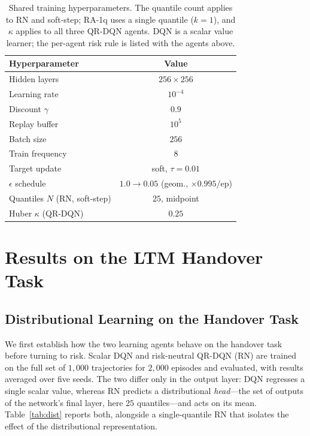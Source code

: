\documentclass[conference]{IEEEtran}
\begin{document}
\begin{table}[htbp]
\caption{Shared training hyperparameters. The quantile count applies to RN and
soft-step; RA-1q uses a single quantile ($k{=}1$), and $\kappa$ applies to all
three QR-DQN agents. DQN is a scalar value learner; the per-agent risk rule is
listed with the agents above.}
\label{tab:hparams}
\centering
\begin{tabular}{|l|c|}
\hline
\textbf{Hyperparameter} & \textbf{Value} \\
\hline
Hidden layers       & $256\times256$ \\
Learning rate       & $10^{-4}$ \\
Discount $\gamma$   & $0.9$ \\
Replay buffer       & $10^{5}$ \\
Batch size          & $256$ \\
Train frequency     & $8$ \\
Target update       & soft, $\tau{=}0.01$ \\
$\epsilon$ schedule & $1.0 \to 0.05$ (geom., $\times0.995/$ep) \\
\hline
Quantiles $N$ (RN, soft-step) & $25$, midpoint \\
Huber $\kappa$ (QR-DQN)       & $0.25$ \\
\hline
\end{tabular}
\end{table}

\section{Results on the LTM Handover Task}
\label{sec:results}

\subsection{Distributional Learning on the Handover Task}
\label{sec:results-dist}
We first establish how the two learning agents behave on the handover task before
turning to risk. Scalar DQN and risk-neutral QR-DQN (RN) are trained on the full
set of $1{,}000$ trajectories for $2{,}000$ episodes and evaluated, with results
averaged over five seeds. The two differ only in the output layer: DQN regresses a single
scalar value, whereas RN predicts a distributional \emph{head}---the set of
outputs of the network's final layer, here $25$ quantiles---and acts on its mean.
Table~\ref{tab:dist} reports both, alongside a single-quantile RN that isolates the
effect of the distributional representation.
\end{document}
